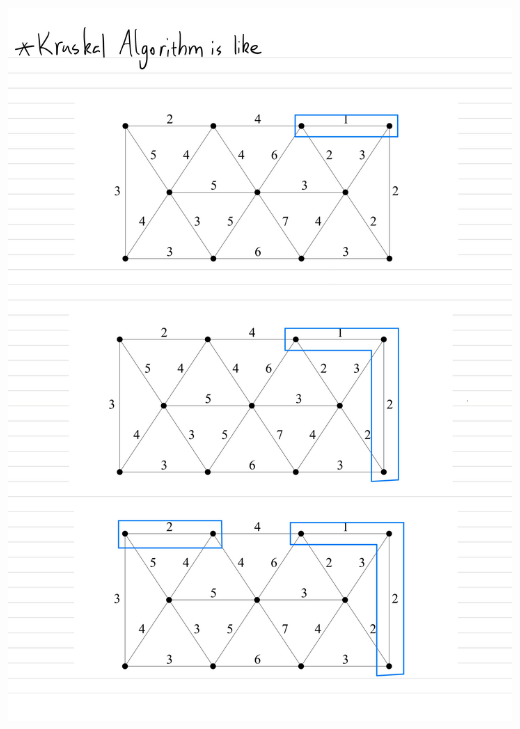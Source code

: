 \documentclass[]{article}
\theoremstyle{definition}
\begin{document}
    \begin{center}
        \includegraphics[width=14cm]{HW1-8.jpg}
    \end{center}
\end{document}
